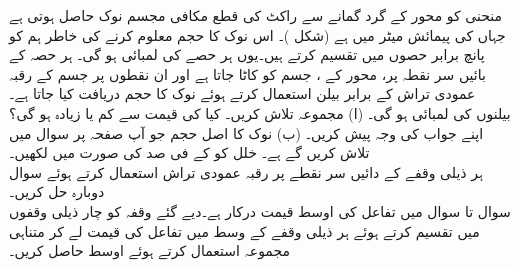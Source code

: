 
منحنی  کو محور   کے گرد گمانے سے   راکٹ کی قطع مکافی مجسم نوک حاصل ہوتی ہے جہاں  کی پیمائش میٹر  میں ہے (شکل )۔ اس نوک کا حجم معلوم کرنے کی خاطر ہم  کو پانچ  برابر حصوں میں تقسیم کرتے ہیں۔یوں ہر حصے کی لمبائی  ہو گی۔ ہر حصہ کے بائیں سر نقطہ پر، محور    کے ،  جسم کو کاٹا جاتا ہے اور ان نقطوں پر جسم کے رقبہ عمودی تراش کے برابر بیلن استعمال کرتے ہوئے نوک کا حجم دریافت کیا جاتا ہے۔ بیلنوں کی لمبائی  ہو گی۔ (ا) مجموعہ  تلاش کریں۔ کیا  کی قیمت  سے کم یا زیادہ ہو گی؟ اپنے جواب کی وجہ پیش کریں۔ (ب) نوک کا اصل حجم جو آپ  صفحہ  پر سوال  میں تلاش کریں گے   ہے۔ خلل  کو  کے فی صد کی صورت میں لکھیں۔ \\
ہر ذیلی وقفے کے دائیں سر نقطے پر رقبہ عمودی تراش استعمال کرتے ہوئے سوال   دوبارہ حل کریں۔
\\
سوال  تا سوال  میں تفاعل  کی اوسط قیمت درکار ہے۔دیے گئے وقفہ کو چار ذیلی وقفوں میں تقسیم کرتے ہوئے ہر ذیلی وقفے کے وسط میں تفاعل کی قیمت  لے کر متناہی مجموعہ استعمال کرتے ہوئے اوسط حاصل کریں۔

